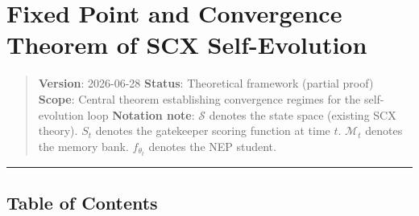 \documentclass[
  12pt,
]{article}
\author{SCX}
\date{2026}
\begin{document}
\section{Fixed Point and Convergence Theorem of SCX
Self-Evolution}\label{fixed-point-and-convergence-theorem-of-scx-self-evolution}

\begin{quote}
\textbf{Version}: 2026-06-28 \textbar{} \textbf{Status}: Theoretical
framework (partial proof) \textbar{} \textbf{Scope}: Central theorem
establishing convergence regimes for the self-evolution loop
\textbf{Notation note}: \(\mathcal{S}\) denotes the state space
(existing SCX theory). \(S_t\) denotes the gatekeeper scoring function
at time \(t\). \(\mathcal{M}_t\) denotes the memory bank.
\(f_{\theta_t}\) denotes the NEP student.
\end{quote}

\begin{center}\rule{0.5\linewidth}{0.5pt}\end{center}

\subsection{Table of Contents}\label{table-of-contents}
\end{document}
